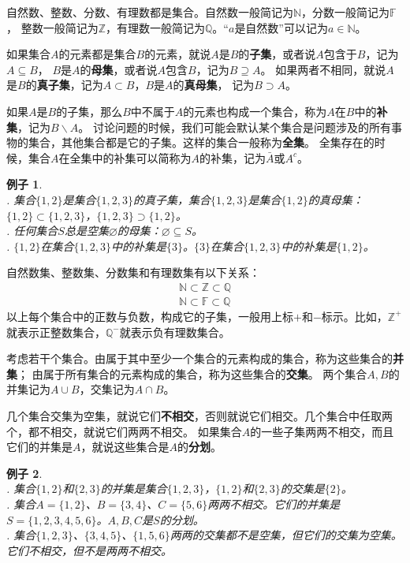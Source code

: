\documentclass[12pt,UTF8]{ctexbook}
\newtheorem{ex}{例子}[section]
\begin{document}
自然数、整数、分数、有理数都是集合。自然数一般简记为$\mathbb{N}$，分数一般简记为$\mathbb{F}$，
整数一般简记为$\mathbb{Z}$，有理数一般简记为$\mathbb{Q}$。“$a$是自然数”可以记为$a\in\mathbb{N}$。

如果集合$A$的元素都是集合$B$的元素，就说$A$是$B$的\textbf{子集}，或者说$A$包含于$B$，记为$A\subseteq B$，
$B$是$A$的\textbf{母集}，或者说$A$包含$B$，记为$B\supseteq A$。
如果两者不相同，就说$A$是$B$的\textbf{真子集}，记为$A\subset B$，$B$是$A$的\textbf{真母集}，
记为$B\supset A$。

如果$A$是$B$的子集，那么$B$中不属于$A$的元素也构成一个集合，称为$A$在$B$中的\textbf{补集}，记为$B\backslash A$。
讨论问题的时候，我们可能会默认某个集合是问题涉及的所有事物的集合，其他集合都是它的子集。这样的集合一般称为\textbf{全集}。
全集存在的时候，集合$A$在全集中的补集可以简称为$A$的补集，记为$\bar{A}$或$A^c$。

\begin{ex}\label{ex:2-0-10}
    \mbox{} \\ 
    . 集合$\{1,2\}$是集合$\{1,2,3\}$的真子集，集合$\{1,2,3\}$是集合$\{1,2\}$的真母集：$\{1,2\}\subset \{1,2,3\}$，$\{1,2,3\}\supset \{1,2\}$。\\
    . 任何集合$S$总是空集$\varnothing$的母集：$\varnothing \subseteq S$。\\
    . $\{1,2\}$在集合$\{1,2,3\}$中的补集是$\{3\}$。$\{3\}$在集合$\{1,2,3\}$中的补集是$\{1,2\}$。
\end{ex}

自然数集、整数集、分数集和有理数集有以下关系：
\begin{align*}
    \mathbb{N}\subset\mathbb{Z}\subset\mathbb{Q}  \\
    \mathbb{N}\subset\mathbb{F}\subset\mathbb{Q} 
\end{align*}
以上每个集合中的正数与负数，构成它的子集，一般用上标$+$和$-$标示。比如，$\mathbb{Z}^+$就表示正整数集合，$\mathbb{Q}^-$就表示负有理数集合。

考虑若干个集合。由属于其中至少一个集合的元素构成的集合，称为这些集合的\textbf{并集}；
由属于所有集合的元素构成的集合，称为这些集合的\textbf{交集}。
两个集合$A, B$的并集记为$A\cup B$，交集记为$A\cap B$。

几个集合交集为空集，就说它们\textbf{不相交}，否则就说它们相交。几个集合中任取两个，都不相交，就说它们两两不相交。
如果集合$A$的一些子集两两不相交，而且它们的并集是$A$，就说这些集合是$A$的\textbf{分划}。

\begin{ex}\label{ex:2-0-20}
    \mbox{} \\ 
    . 集合$\{1,2\}$和$\{2,3\}$的并集是集合$\{1,2,3\}$，$\{1,2\}$和$\{2,3\}$的交集是$\{2\}$。\\
    . 集合$A = \{1,2\}$、$B = \{3,4\}$、$C = \{5,6\}$两两不相交。它们的并集是$S = \{1,2,3,4,5,6\}$。$A,B,C$是$S$的分划。\\
    . 集合$ \{1,2,3\}$、$\{3,4,5\}$、$\{1,5,6\}$两两的交集都不是空集，但它们的交集为空集。它们不相交，但不是两两不相交。
\end{ex}
\end{document}
